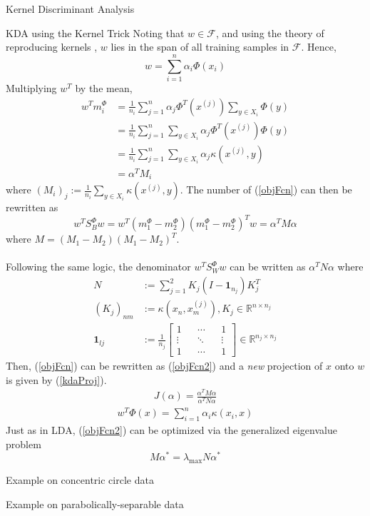 \begin{section}{Kernel Discriminant Analysis}
\begin{subsection}{KDA using the Kernel Trick}
Noting that $w \in \mathcal{F}$, and using the theory of reproducing kernels \cite{kernTheory}, $w$ lies in the span of all training samples in $\mathcal{F}$. Hence, 
$$
	w = \sum_{i=1}^n \alpha_i \Phi \left( x_i \right)
$$
Multiplying $w^T$ by the mean,
\begin{align*}
	w^T m_i^{\Phi} &= \frac{1}{n_i} \sum_{j=1}^n \alpha_j \Phi^T \left( x^{(j)} \right)
		\sum_{y \in X_i} \Phi \left( y \right ) \\
	&= \frac{1}{n_i} \sum_{j=1}^n \sum_{y \in X_i} 
		\alpha_j \Phi^T \left( x^{(j)} \right) \Phi \left( y \right ) \\
	&= \frac{1}{n_i} \sum_{j=1}^n \sum_{y \in X_i} \alpha_j \kappa \left( x^{(j)}, y \right) \\
	&= \alpha^T M_i
\end{align*}
where $\left( M_i \right)_j := \frac{1}{n_i} \sum_{y \in X_i} \kappa \left( x^{(j)}, y  \right)$. 
The number of (\ref{objFcn}) can then be rewritten as
$$
	w^T S_B^\Phi w = w^T (m_1^\Phi - m_2^\Phi) (m_1^\Phi - m_2^\Phi)^T w
		= \alpha^T M \alpha
$$
where $M = (M_1 - M_2)(M_1 - M_2)^T$.
\\
\\
Following the same logic, the denominator $w^T S_W^{\Phi} w$ can be written as $\alpha^T N \alpha$ where
\begin{align*}
	N &:= \sum_{j=1}^2 K_j (I - \bm{1}_{n_j}) K_j^T \\
	\left( K_j \right)_{nm} &:= \kappa \left( x_n, x_m^{(j)} \right), K_j \in \mathbb{R}^{n \times n_j}\\
	\bm{1}_{lj} &:= \frac{1}{n_j} \begin{bmatrix} 1 && \cdots && 1 \\ \vdots && \ddots && \vdots \\ 1&& \cdots && 1 \end{bmatrix} \in \mathbb{R}^{n_j \times n_j}
\end{align*}
Then, (\ref{objFcn}) can be rewritten as (\ref{objFcn2}) and a \textit{new} projection of $x$ onto $w$ is given by (\ref{kdaProj}).
\begin{align}
	J(\alpha) = \frac{\alpha^T M \alpha }{\alpha^T N \alpha} \label{objFcn2}
\end{align}
\begin{align}
	w^T \Phi(x) = \sum_{i=1}^n \alpha_i \kappa(x_i,x) \label{kdaProj}
\end{align}
Just as in LDA, (\ref{objFcn2}) can be optimized via the generalized eigenvalue problem
$$
	M \alpha^* = \lambda_{\text{max}} N \alpha^*
$$
\end{subsection}

\begin{subsection}{Example on concentric circle data}
	
\end{subsection}

\begin{subsection}{Example on parabolically-separable data}
	
\end{subsection}

\end{section}


